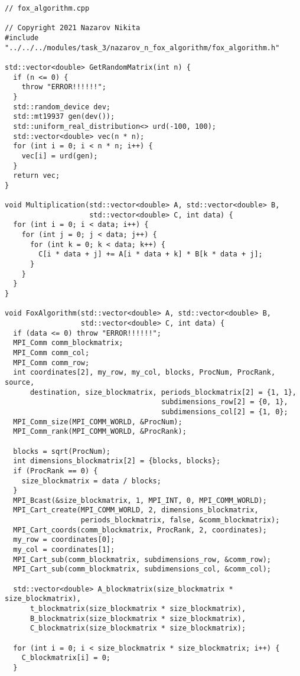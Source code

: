 \documentclass{report}
\begin{document}
\begin{lstlisting}
// fox_algorithm.cpp

// Copyright 2021 Nazarov Nikita
#include "../../../modules/task_3/nazarov_n_fox_algorithm/fox_algorithm.h"

std::vector<double> GetRandomMatrix(int n) {
  if (n <= 0) {
    throw "ERROR!!!!!!";
  }
  std::random_device dev;
  std::mt19937 gen(dev());
  std::uniform_real_distribution<> urd(-100, 100);
  std::vector<double> vec(n * n);
  for (int i = 0; i < n * n; i++) {
    vec[i] = urd(gen);
  }
  return vec;
}

void Multiplication(std::vector<double> A, std::vector<double> B,
                    std::vector<double> C, int data) {
  for (int i = 0; i < data; i++) {
    for (int j = 0; j < data; j++) {
      for (int k = 0; k < data; k++) {
        C[i * data + j] += A[i * data + k] * B[k * data + j];
      }
    }
  }
}

void FoxAlgorithm(std::vector<double> A, std::vector<double> B,
                  std::vector<double> C, int data) {
  if (data <= 0) throw "ERROR!!!!!!";
  MPI_Comm comm_blockmatrix;
  MPI_Comm comm_col;
  MPI_Comm comm_row;
  int coordinates[2], my_row, my_col, blocks, ProcNum, ProcRank, source,
      destination, size_blockmatrix, periods_blockmatrix[2] = {1, 1},
                                     subdimensions_row[2] = {0, 1},
                                     subdimensions_col[2] = {1, 0};
  MPI_Comm_size(MPI_COMM_WORLD, &ProcNum);
  MPI_Comm_rank(MPI_COMM_WORLD, &ProcRank);

  blocks = sqrt(ProcNum);
  int dimensions_blockmatrix[2] = {blocks, blocks};
  if (ProcRank == 0) {
    size_blockmatrix = data / blocks;
  }
  MPI_Bcast(&size_blockmatrix, 1, MPI_INT, 0, MPI_COMM_WORLD);
  MPI_Cart_create(MPI_COMM_WORLD, 2, dimensions_blockmatrix,
                  periods_blockmatrix, false, &comm_blockmatrix);
  MPI_Cart_coords(comm_blockmatrix, ProcRank, 2, coordinates);
  my_row = coordinates[0];
  my_col = coordinates[1];
  MPI_Cart_sub(comm_blockmatrix, subdimensions_row, &comm_row);
  MPI_Cart_sub(comm_blockmatrix, subdimensions_col, &comm_col);

  std::vector<double> A_blockmatrix(size_blockmatrix * size_blockmatrix),
      t_blockmatrix(size_blockmatrix * size_blockmatrix),
      B_blockmatrix(size_blockmatrix * size_blockmatrix),
      C_blockmatrix(size_blockmatrix * size_blockmatrix);

  for (int i = 0; i < size_blockmatrix * size_blockmatrix; i++) {
    C_blockmatrix[i] = 0;
  }


\end{lstlisting}
\end{document}
